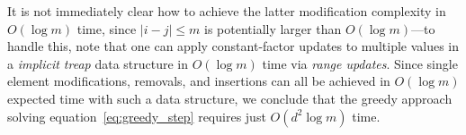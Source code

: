 \documentclass[sn-mathphys]{sn-jnl}
\begin{document}
It is not immediately clear how to achieve the latter modification complexity in $O(\log m)$ time, since $\lvert i - j \rvert \leq m$ is potentially larger than $O(\log m)$---to handle this, note that one can apply constant-factor updates to multiple values in a \emph{implicit treap} data structure in $O(\log m)$ time via \emph{range updates}. 
Since single element modifications, removals, and insertions can all be achieved in $O(\log m)$ expected time with such a data structure, we conclude that the greedy approach solving equation~\eqref{eq:greedy_step} requires just $O(d^2 \log m)$ time. 

\end{document}
